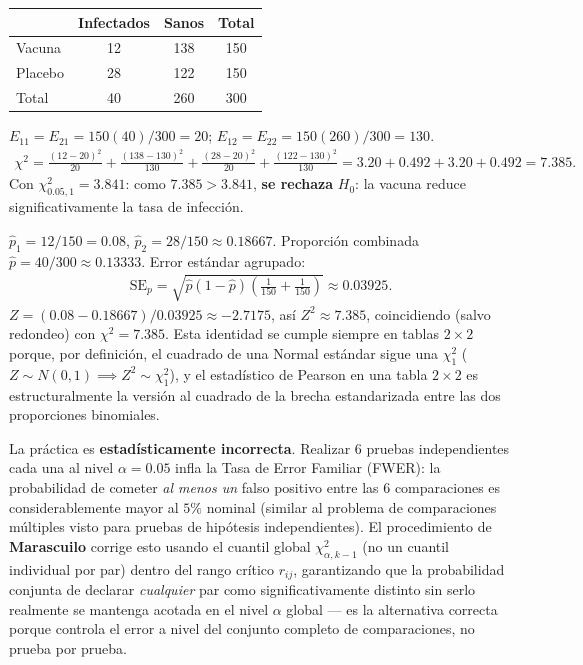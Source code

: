 \begin{solproblema}[prob:3a99a23]
	\begin{center}
		\begin{tabular}{|l|c|c|c|}\hline
			 & Infectados & Sanos & Total \\\hline
			Vacuna & 12 & 138 & 150 \\\hline
			Placebo & 28 & 122 & 150 \\\hline
			Total & 40 & 260 & 300 \\\hline
		\end{tabular}
	\end{center}
	$E_{11}=E_{21}=150(40)/300=20$; $E_{12}=E_{22}=150(260)/300=130$.
	\begin{align*}
		\chi^2 = \frac{(12-20)^2}{20}+\frac{(138-130)^2}{130}+\frac{(28-20)^2}{20}+\frac{(122-130)^2}{130} = 3.20+0.492+3.20+0.492 = 7.385.
	\end{align*}
	Con $\chi^2_{0.05,1}=3.841$: como $7.385>3.841$, \textbf{se rechaza} $H_0$: la vacuna reduce significativamente la tasa de infección.
\end{solproblema}

\begin{solproblema}[prob:a98f897]
	$\hat p_1=12/150=0.08$, $\hat p_2=28/150\approx0.18667$. Proporción combinada $\hat p=40/300\approx0.13333$. Error estándar agrupado:
	\begin{align*}
		\text{SE}_p = \sqrt{\hat p(1-\hat p)\left(\frac{1}{150}+\frac{1}{150}\right)} \approx0.03925.
	\end{align*}
	$Z = (0.08-0.18667)/0.03925 \approx-2.7175$, así $Z^2\approx7.385$, coincidiendo (salvo redondeo) con $\chi^2=7.385$. Esta identidad se cumple siempre en tablas $2\times2$ porque, por definición, el cuadrado de una Normal estándar sigue una $\chi^2_1$ ($Z\sim N(0,1)\implies Z^2\sim\chi^2_1$), y el estadístico de Pearson en una tabla $2\times2$ es estructuralmente la versión al cuadrado de la brecha estandarizada entre las dos proporciones binomiales.
\end{solproblema}

\begin{solproblema}[prob:cb7e8b6]
	La práctica es \textbf{estadísticamente incorrecta}. Realizar $6$ pruebas independientes cada una al nivel $\alpha=0.05$ infla la Tasa de Error Familiar (FWER): la probabilidad de cometer \emph{al menos un} falso positivo entre las $6$ comparaciones es considerablemente mayor al $5\%$ nominal (similar al problema de comparaciones múltiples visto para pruebas de hipótesis independientes). El procedimiento de \textbf{Marascuilo} corrige esto usando el cuantil global $\chi^2_{\alpha,k-1}$ (no un cuantil individual por par) dentro del rango crítico $r_{ij}$, garantizando que la probabilidad conjunta de declarar \emph{cualquier} par como significativamente distinto sin serlo realmente se mantenga acotada en el nivel $\alpha$ global — es la alternativa correcta porque controla el error a nivel del conjunto completo de comparaciones, no prueba por prueba.
\end{solproblema}

